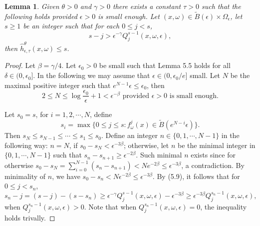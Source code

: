 \documentclass[11pt,oneside]{article}
\theoremstyle{plain}
\newtheorem{lem}{Lemma}[section]
\numberwithin{equation}{section}
\numberwithin{figure}{section}
\numberwithin{table}{section}
\begin{document}
\begin{lem}
Given $\theta > 0$ and $\gamma > 0$ there exists a constant $\tau > 0$ such that the following holds provided $\epsilon > 0$ is small enough. Let $(x, \omega) \in \tilde B(\epsilon) \times \Omega_{\epsilon}$, let $s \geq 1$ be an integer such that for each $0 \leq j < s$, 
\begin{equation}
s - j > \epsilon^{- \gamma} Q_{j}^{s-1} (x, \omega, \epsilon),
\end{equation}
then $\hat h_{\epsilon, \tau}^{\theta} (x, \omega) \leq s$.
\end{lem}


\begin{proof}

Let $\beta = \gamma/4$. Let $\epsilon_0 > 0$ be small such that Lemma 5.5 holds for all $\delta \in (0, \epsilon_0]$. In the following we may assume that $\epsilon \in (0, \epsilon_0 /e]$ small. Let $N$ be the maximal positive integer such that $e^{N-1} \epsilon \leq \epsilon_0$, then 
\[
2 \leq N \leq \log \frac{\epsilon_0}{\epsilon} + 1 < \epsilon^{- \beta} \mbox{ provided $\epsilon > 0$  is small enough}.
\]


Let $s_0 = s$, for $i = 1, 2, \cdots, N$, define 
\[
s_i = \max\{0 \leq j \leq s : f_{\omega}^j (x) \in \tilde B(e^{N-i} \epsilon)  \}.
\]
Then $s_N \leq s_{N-1} \leq \cdots \leq s_1 \leq s_0$. Define an integer $n \in \{0, 1, \cdots, N-1\}$ in the following way: $n = N$, if $s_0 - s_N < \epsilon^{-3 \beta}$; otherwise, let $n$ be the minimal integer in $ \{0, 1, \cdots, N-1\}$ such that $s_n - s_{n+1} \geq {\epsilon}^{-2 \beta}$. Such minimal $n$ exists since for otherwise $s_0 - s_N = \sum_{i=0}^{N-1} (s_n - s_{n+1}) < N e^{-2 \beta} \leq {\epsilon}^{-3 \beta}$, a contradiction. By minimality of $n$, we have  $s_0 - s_n < N \epsilon^{-2 \beta} \leq \epsilon^{-3 \beta}$. By (5.9), it follows that for $0 \leq j < s_n$,
\begin{equation}
s_n - j = (s - j) - (s - s_n) \geq \epsilon^{- \gamma} Q_{j}^{s-1} (x, \omega, \epsilon) - \epsilon^{-3 \beta} \geq \epsilon^{- 3\beta} Q_{j}^{s_n-1} (x, \omega, \epsilon),
\end{equation}
when $Q_{j}^{s_n-1} (x, \omega, \epsilon)> 0$. Note that when $Q_{j}^{s_n-1} (x, \omega, \epsilon)= 0$, the inequality holds trivally. 



\end{proof}
\end{document}
